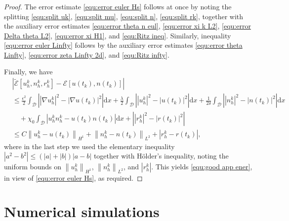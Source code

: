 \documentclass[11pt, reqno]{amsart}
\theoremstyle{definition}
\numberwithin{equation}{section}
\newcommand{\dx}{\mathrm{d}x}
\newcommand{\norm}[2]{\left\|{#1}\right\|_{#2}}
\newcommand{\abs}[1]{\left|{#1}\right|}
\begin{document}
\begin{proof}
The error estimate \eqref{equ:error euler Hs} follows at once by noting the splitting \eqref{equ:split uk}, \eqref{equ:split mu}, \eqref{equ:split n}, \eqref{equ:split rk}, together with the auxiliary error estimates \eqref{equ:error theta n eul}, \eqref{equ:error xi k L2}, \eqref{equ:error Delta theta L2}, \eqref{equ:error xi H1}, and \eqref{equ:Ritz ineq}. Similarly, inequality \eqref{equ:error euler Linfty} follows by the auxiliary error estimates \eqref{equ:error theta Linfty}, \eqref{equ:error zeta Linfty 2d}, and \eqref{equ:Ritz infty}.

Finally, we have
\begin{align*}
    &\abs{\widetilde{\mathcal{E}}[u_h^k,n_h^k,r_h^k] - \mathcal{E}[u(t_k),n(t_k)]}
    \\
    &\leq
    \frac{\epsilon^2}{2} \int_\mathscr{D} \abs{ \abs{\nabla u_h^k}^2 - \abs{\nabla u(t_k)}^2 } \dx 
    +
    \frac{\lambda}{2} \int_\mathscr{D} \abs{ \abs{u_h^k}^2 - \abs{u(t_k)}^2 } \dx 
    +
    \frac{1}{2\delta} \int_\mathscr{D} \abs{ \abs{n_h^k}^2 - \abs{n(t_k)}^2 } \dx 
    \\
    &\quad
    +
    \chi_0 \int_\mathscr{D} \abs{ u_h^k n_h^k - u(t_k) n(t_k) } \dx 
    +
    \abs{ \abs{r_h^k}^2 - \abs{r(t_k)}^2 }
    \\
    &\leq
    C \norm{u_h^k-u(t_k)}{H^1} + \norm{n_h^k-n(t_k)}{L^2} + \abs{r_h^k- r(t_k)},
\end{align*}
where in the last step we used the elementary inequality $|a^2-b^2|\leq \left(|a|+|b|\right) |a-b|$ together with H\"older's inequality, noting the uniform bounds on $\norm{u_h^k}{H^1}$, $\norm{n_h^k}{L^2}$, and $|r_h^k|$. This yields \eqref{equ:good app ener}, in view of \eqref{equ:error euler Hs}, as required.
\end{proof}


\section{Numerical simulations}\label{sec:exp}
\end{document}
